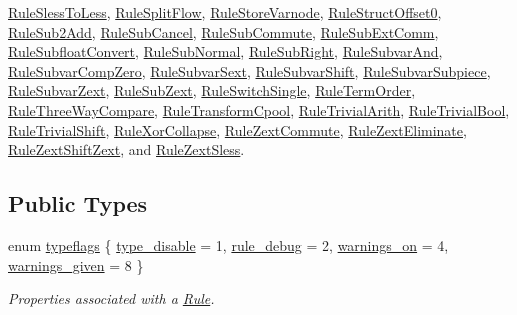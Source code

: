 \mbox{\hyperlink{class_rule_sless_to_less}{Rule\+Sless\+To\+Less}}, \mbox{\hyperlink{class_rule_split_flow}{Rule\+Split\+Flow}}, \mbox{\hyperlink{class_rule_store_varnode}{Rule\+Store\+Varnode}}, \mbox{\hyperlink{class_rule_struct_offset0}{Rule\+Struct\+Offset0}}, \mbox{\hyperlink{class_rule_sub2_add}{Rule\+Sub2\+Add}}, \mbox{\hyperlink{class_rule_sub_cancel}{Rule\+Sub\+Cancel}}, \mbox{\hyperlink{class_rule_sub_commute}{Rule\+Sub\+Commute}}, \mbox{\hyperlink{class_rule_sub_ext_comm}{Rule\+Sub\+Ext\+Comm}}, \mbox{\hyperlink{class_rule_subfloat_convert}{Rule\+Subfloat\+Convert}}, \mbox{\hyperlink{class_rule_sub_normal}{Rule\+Sub\+Normal}}, \mbox{\hyperlink{class_rule_sub_right}{Rule\+Sub\+Right}}, \mbox{\hyperlink{class_rule_subvar_and}{Rule\+Subvar\+And}}, \mbox{\hyperlink{class_rule_subvar_comp_zero}{Rule\+Subvar\+Comp\+Zero}}, \mbox{\hyperlink{class_rule_subvar_sext}{Rule\+Subvar\+Sext}}, \mbox{\hyperlink{class_rule_subvar_shift}{Rule\+Subvar\+Shift}}, \mbox{\hyperlink{class_rule_subvar_subpiece}{Rule\+Subvar\+Subpiece}}, \mbox{\hyperlink{class_rule_subvar_zext}{Rule\+Subvar\+Zext}}, \mbox{\hyperlink{class_rule_sub_zext}{Rule\+Sub\+Zext}}, \mbox{\hyperlink{class_rule_switch_single}{Rule\+Switch\+Single}}, \mbox{\hyperlink{class_rule_term_order}{Rule\+Term\+Order}}, \mbox{\hyperlink{class_rule_three_way_compare}{Rule\+Three\+Way\+Compare}}, \mbox{\hyperlink{class_rule_transform_cpool}{Rule\+Transform\+Cpool}}, \mbox{\hyperlink{class_rule_trivial_arith}{Rule\+Trivial\+Arith}}, \mbox{\hyperlink{class_rule_trivial_bool}{Rule\+Trivial\+Bool}}, \mbox{\hyperlink{class_rule_trivial_shift}{Rule\+Trivial\+Shift}}, \mbox{\hyperlink{class_rule_xor_collapse}{Rule\+Xor\+Collapse}}, \mbox{\hyperlink{class_rule_zext_commute}{Rule\+Zext\+Commute}}, \mbox{\hyperlink{class_rule_zext_eliminate}{Rule\+Zext\+Eliminate}}, \mbox{\hyperlink{class_rule_zext_shift_zext}{Rule\+Zext\+Shift\+Zext}}, and \mbox{\hyperlink{class_rule_zext_sless}{Rule\+Zext\+Sless}}.

\subsection*{Public Types}
\begin{DoxyCompactItemize}
\item 
enum \mbox{\hyperlink{class_rule_a605c4d4f6690f01deb9aa08c358fbc43}{typeflags}} \{ \mbox{\hyperlink{class_rule_a605c4d4f6690f01deb9aa08c358fbc43abee2f75196ccb896f6288ba044adcf93}{type\+\_\+disable}} = 1, 
\mbox{\hyperlink{class_rule_a605c4d4f6690f01deb9aa08c358fbc43abe38bd9cfb49aea7e6cb1bf46a88ad20}{rule\+\_\+debug}} = 2, 
\mbox{\hyperlink{class_rule_a605c4d4f6690f01deb9aa08c358fbc43a42bedddab8f9d5f8fcfd165b0f8fb3e3}{warnings\+\_\+on}} = 4, 
\mbox{\hyperlink{class_rule_a605c4d4f6690f01deb9aa08c358fbc43a50c94d6ecacaf041c1b9dde93a4df022}{warnings\+\_\+given}} = 8
 \}
\begin{DoxyCompactList}\small\item\em Properties associated with a \mbox{\hyperlink{class_rule}{Rule}}. \end{DoxyCompactList}\end{DoxyCompactItemize}
